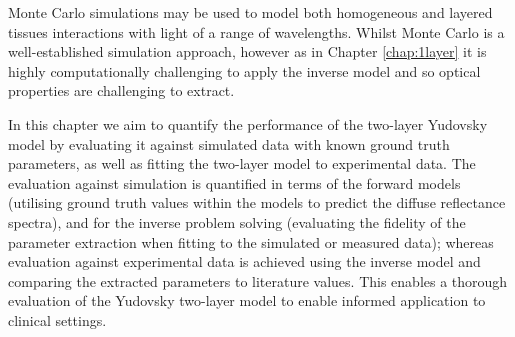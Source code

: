 


Monte Carlo simulations may be used to model both homogeneous and layered tissues interactions with light of a range of wavelengths. Whilst Monte Carlo is a well-established simulation approach, however as in Chapter \ref{chap:1layer} it is highly computationally challenging to apply the inverse model and so optical properties are challenging to extract.

In this chapter we aim to quantify the performance of the two-layer Yudovsky model by evaluating it against simulated data with known ground truth parameters, as well as fitting the two-layer model to experimental data. The evaluation against simulation is quantified in terms of the forward models (utilising ground truth values within the models to predict the diffuse reflectance spectra), and for the inverse problem solving (evaluating the fidelity of the parameter extraction when fitting to the simulated or measured data); whereas evaluation against experimental data is achieved using the inverse model and comparing the extracted parameters to literature values. This enables
a thorough evaluation of the Yudovsky two-layer model to enable informed application to clinical settings. 

